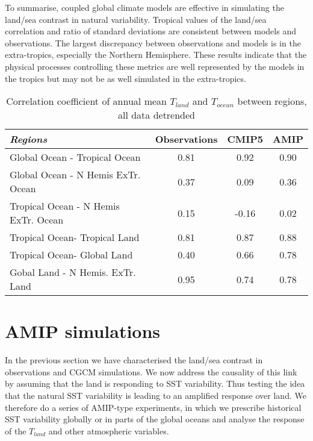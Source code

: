 To summarise, coupled global climate models are effective in simulating the 
land/sea contrast in natural variability. Tropical values of the land/sea 
correlation and ratio of standard deviations are consistent between models and 
observations. The largest discrepancy between observations and models is in the 
extra-tropics, especially the Northern Hemisphere. These results indicate that 
the physical processes controlling these metrics are well represented by the 
models in the tropics but may not be as well simulated in the extra-tropics.

\begin{center}
	\begin{table}[ht]
	\caption{Correlation coefficient of annual mean $T_{land}$ and $T_{ocean}$ 
	between regions, all data detrended}
		\label{tab:crossrel}
	\begin{tabular}{ l  c  c  c}
		\textit{Regions}		&  Observations  & CMIP5 & AMIP \\ \hline
		Global Ocean - Tropical Ocean & 0.81 & 0.92 & 0.90 \\
		Global Ocean - N Hemis ExTr. Ocean & 0.37 & 0.09 & 0.36 \\
		Tropical Ocean - N Hemis ExTr. Ocean & 0.15 & -0.16  & 0.02 \\
		Tropical Ocean- Tropical Land & 0.81 & 0.87 & 0.88 \\
		Tropical Ocean- Global Land & 0.40 & 0.66 & 0.78 \\
		Gobal Land - N Hemis. ExTr. Land & 0.95 & 0.74 & 0.78\\
	\end{tabular}
	\end{table}
\end{center}




\section{AMIP simulations}

In the previous section we have characterised the land/sea contrast in 
observations and CGCM simulations. We now address the causality of this link by 
assuming that the land is responding to SST variability. Thus testing the idea 
that the natural SST variability is leading to an amplified response over land.  
We therefore do a series of AMIP-type experiments, in which we prescribe 
historical SST variability globally or in parts of the global oceans and analyse 
the response of the $T_{land}$ and other atmospheric variables.

